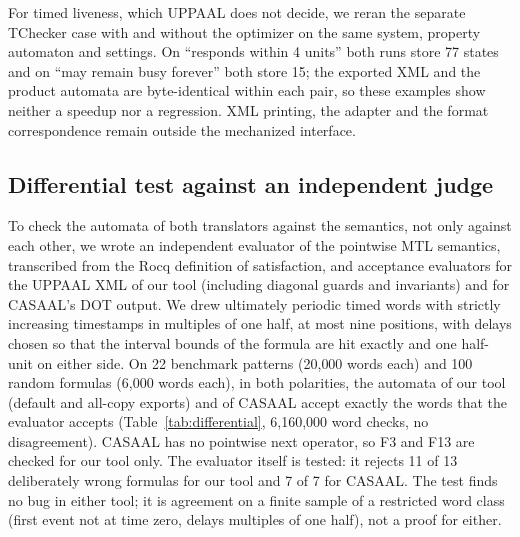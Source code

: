 For timed liveness, which UPPAAL does not decide, we reran the separate TChecker case with and without the optimizer on the same system, property automaton and settings. On ``responds within 4 units'' both runs store 77 states and on ``may remain busy forever'' both store 15; the exported XML and the product automata are byte-identical within each pair, so these examples show neither a speedup nor a regression. XML printing, the adapter and the format correspondence remain outside the mechanized interface.

\subsection{Differential test against an independent judge}
\label{sec:differential}
\begin{table}[tp]
\centering
\caption{Agreement of the automata with an independent evaluator of the MTL semantics on random ultimately periodic timed words (both polarities of each formula). A word check is one (formula, word, polarity) triple for one automaton; the words are ultimately periodic with delays that are multiples of one half and at most nine positions. CASAAL is checked on the 20 patterns it encodes (it has no next operator for F3 and F13). A disagreement is a word on which the automaton and the evaluator differ.}
\label{tab:differential}
\small

\end{table}
To check the automata of both translators against the semantics, not only against each other, we wrote an independent evaluator of the pointwise MTL semantics, transcribed from the Rocq definition of satisfaction, and acceptance evaluators for the UPPAAL XML of our tool (including diagonal guards and invariants) and for CASAAL's DOT output. We drew ultimately periodic timed words with strictly increasing timestamps in multiples of one half, at most nine positions, with delays chosen so that the interval bounds of the formula are hit exactly and one half-unit on either side. On 22 benchmark patterns (20{,}000 words each) and 100 random formulas (6{,}000 words each), in both polarities, the automata of our tool (default and all-copy exports) and of CASAAL accept exactly the words that the evaluator accepts (Table~\ref{tab:differential}, 6{,}160{,}000 word checks, no disagreement). CASAAL has no pointwise next operator, so F3 and F13 are checked for our tool only. The evaluator itself is tested: it rejects 11 of 13 deliberately wrong formulas for our tool and 7 of 7 for CASAAL. The test finds no bug in either tool; it is agreement on a finite sample of a restricted word class (first event not at time zero, delays multiples of one half), not a proof for either.

